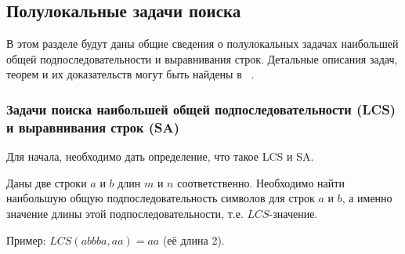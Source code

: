 

\subsection{Полулокальные задачи поиска}

В этом разделе будут даны общие сведения о полулокальных задачах наибольшей общей подпоследовательности и выравнивания строк.
Детальные описания задач, теорем и их доказательств могут быть найдены в ~\cite{alex2007semilocal}.

\subsubsection{Задачи поиска наибольшей общей подпоследовательности (LCS) и выравнивания строк (SA)}\mbox{}

Для начала, необходимо дать определение, что такое {LCS} и {SA}.

\begin{definition}
Даны две строки $a$ и $b$ длин $m$ и $n$ соответственно.
Необходимо найти наибольшую общую подпоследовательность символов для строк $a$ и $b$, а именно значение длины этой подпоследовательности, т.е. $LCS$-значение.
\end{definition}

Пример: \hspace{1cm}
    $LCS(abbba,aa)=aa$ (её длина 2).
 
